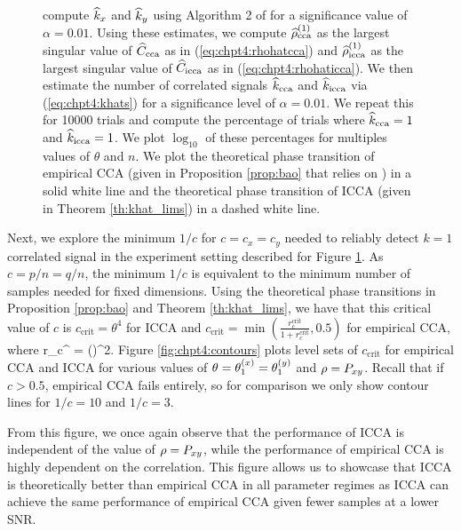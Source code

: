 \begin{figure}
\begin{center}
{      compute $\widehat{k}_x$ and $\widehat{k}_y$ using Algorithm 2 of \cite{nadakuditi2010fundamental}
      for a significance value of $\alpha=0.01$. Using these estimates, we compute
      $\widehat{\rho}_\text{cca}^{(1)}$ as the largest singular value of $\widehat{C}_{\text{cca}}$ as in
      (\ref{eq:chpt4:rhohatcca}) and $\widehat{\rho}_\text{icca}^{(1)}$ as the largest singular value of
      $\widehat{C}_{\text{icca}}$ as in (\ref{eq:chpt4:rhohaticca}). We then estimate the number of
      correlated signals $\widehat{k}_{\text{cca}}$ and $\widehat{k}_{\text{icca}}$ via (\ref{eq:chpt4:khats}) for a
      significance level of $\alpha=0.01$. We repeat this for 10000 trials and compute the
      percentage of trials where $\widehat{k}_{\text{cca}}=1$ and $\widehat{k}_{\text{icca}}=1$. We plot $\log_{10}$ of
      these percentages for multiples values of $\theta$ and $n$. We plot the theoretical
      phase transition of empirical CCA (given in Proposition \ref{prop:bao} that
      relies on \cite{bao2014canonical}) in a solid white line and the theoretical
      phase transition of ICCA (given in Theorem \ref{th:khat_lims}) in a dashed white
      line.}
    \label{fig:chpt4:cca_pt}
  \end{center}
\end{figure}

Next, we explore the minimum $1/c$ for $c=c_x=c_y$ needed to reliably detect $k=1$
correlated signal in the experiment setting described for Figure
\ref{fig:chpt4:cca_pt}. As $c=p/n=q/n$, the minimum $1/c$ is equivalent to the minimum
number of samples needed for fixed dimensions. Using the theoretical phase transitions in
Proposition \ref{prop:bao} and Theorem \ref{th:khat_lims}, we have that this critical
value of $c$ is $c_{\text{crit}} = \theta^4$ for ICCA and $c_{\text{crit}} =
\min\left(\frac{r_c^{\text{crit}}}{1+r_c^{\text{crit}}}, 0.5\right)$ for empirical CCA,
where \be r_c^{} = \left(\right)^2.  \ee
Figure \ref{fig:chpt4:contours} plots level sets of $c_{\text{crit}}$ for empirical CCA
and ICCA for various values of $\theta=\theta^{(x)}_1=\theta^{(y)}_1$ and $\rho=P_{xy}$. Recall that if
$c>0.5$, empirical CCA fails entirely, so for comparison we only show contour lines for
$1/c=10$ and $1/c=3$.

From this figure, we once again observe that the performance of ICCA is independent of the
value of $\rho=P_{xy}$, while the performance of empirical CCA is highly dependent on the
correlation. This figure allows us to showcase that ICCA is theoretically better than
empirical CCA in all parameter regimes as ICCA can achieve the same performance of
empirical CCA given fewer samples at a lower SNR.

